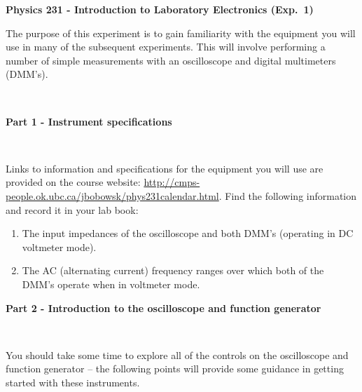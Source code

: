 \documentclass[12pt,oneside,openany,letterpaper]{article}
\begin{document}
\thispagestyle{plain}
\begin{center}
{\large{\bf{\selectfont Physics 231 - Introduction to Laboratory Electronics (Exp.~1)}}}
\end{center}

\noindent The purpose of this experiment is to gain familiarity with the equipment you will use in many of the subsequent experiments. This will involve performing a number of simple measurements with an oscilloscope and digital multimeters (DMM's).

~


{\bf Part 1 - Instrument specifications}

~

\noindent Links to information and specifications for the equipment you will use are provided on the course website: \href{http://cmps-people.ok.ubc.ca/jbobowsk/phys231calendar.html}{http://cmps-people.ok.ubc.ca/jbobowsk/phys231calendar.html}. Find the following information and record it in your lab book:

\begin{enumerate}[label=\alph*)]
\item The input impedances of the oscilloscope and both DMM's (operating in DC voltmeter mode).
\item The AC (alternating current) frequency ranges over which both of the DMM's operate when in voltmeter mode.
\end{enumerate}


{\bf Part 2 - Introduction to the oscilloscope and function generator}

~

\noindent You should take some time to explore all of the controls on the oscilloscope and function generator -- the following points will provide some guidance in getting started with these instruments.
\end{document}
